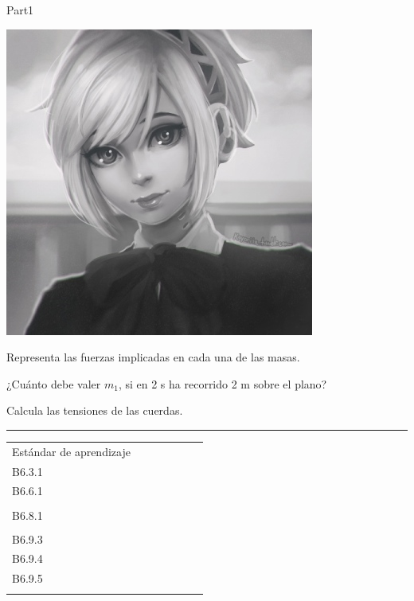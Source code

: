 \documentclass[9pt]{scrartcl}
\begin{document}
\begin{exam}{Part1}
\begin{onehalfspace}
\begin{problem*}[10ea]
\begin{minipage}{\linewidth}
\begin{varwidth}{0.5\linewidth}
\includegraphics[scale=0.4]{grafico5.jpg}
\end{varwidth}\hfill
\begin{varwidth}{0.5\linewidth}
\begin{parts}
\item  Representa las fuerzas implicadas en cada una de las masas.
\item ¿Cuánto debe valer $m_1$, si en 2 s ha recorrido 2 m sobre el plano?
\item Calcula las tensiones de las cuerdas.
\end{parts}
\end{varwidth}
\end{minipage}
\end{problem*}
\hrule
\begin{table}[h]
\begin{center}
\begin{tabular}{|p{3.2cm}|p{1.3cm}|p{1.3cm}|p{1.3cm}|p{1.3cm}|p{1.3cm}|p{1.3cm}|}
\hline
{\scriptsize Estándar de aprendizaje}
& \centering {\scriptsize B6.2.1 \\ B6.3.1 \\ B6.6.1\\ }
& \centering {\scriptsize B6.5.1 \\ B6.8.1\\ }
& \centering {\scriptsize B6.9.2 \\ B6.9.3 \\ B6.9.4 \\ B6.9.5\\ }

\end{tabular}
\end{center}
\end{table}
\end{onehalfspace}
\end{exam}
\end{document}
